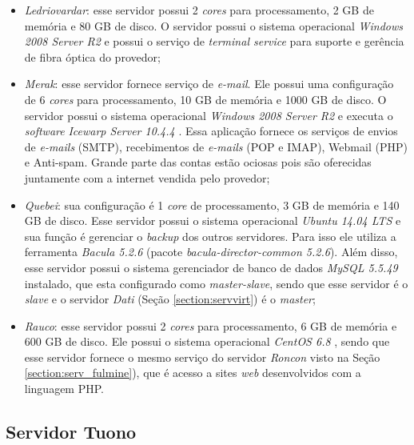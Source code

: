 \begin{itemize}
 \item \textit{Ledriovardar}: esse servidor possui 2 \textit{cores} para processamento, 2 GB de memória e 80 GB de disco. O servidor possui 
 o sistema operacional \textit{Windows 2008 Server R2} e possui o serviço de \textit{terminal service} para suporte e gerência de fibra 
 óptica do provedor;
 
 \item \textit{Merak}: esse servidor fornece serviço de \textit{e-mail}. Ele possui uma configuração de 6 \textit{cores} para processamento, 
 10 GB de memória e 1000 GB de disco. O servidor possui o sistema operacional \textit{Windows 2008 Server R2} e executa o \textit{software} 
 \textit{Icewarp Server 10.4.4} \cite{icewarp}. Essa aplicação fornece os serviços de envios de \textit{e-mails} (\ac{SMTP}), recebimentos 
 de \textit{e-mails} (\ac{POP} e \ac{IMAP}), Webmail (\ac{PHP}) e Anti-spam.
 Grande parte das contas estão ociosas pois são oferecidas juntamente com a internet vendida pelo provedor;
 
 \item \textit{Quebei}: sua configuração é 1 \textit{core} de processamento, 3 GB de memória e 140 GB de disco. Esse servidor possui o 
 sistema operacional \textit{Ubuntu 14.04 \ac{LTS}} \cite{ubuntu} e sua função é gerenciar o \textit{backup} dos outros servidores. Para isso 
 ele utiliza a ferramenta \textit{Bacula 5.2.6} \cite{bacula} (pacote \textit{bacula-director-common 5.2.6}). Além disso, esse servidor possui 
 o sistema gerenciador de banco de dados \textit{MySQL 5.5.49} \cite{mysql} instalado, que esta configurado como \textit{master-slave}, sendo 
 que esse servidor é o \textit{slave} e o servidor \textit{Dati} (Seção \ref{section:servvirt}) é o \textit{master};
 
 \item \textit{Rauco}: esse servidor possui 2 \textit{cores} para processamento, 6 GB de memória e 600 GB de disco. Ele possui o sistema 
 operacional \textit{CentOS 6.8} \cite{centos}, sendo que esse servidor fornece o mesmo serviço do servidor \textit{Roncon} visto na 
 Seção \ref{section:serv_fulmine}), que é acesso a sites \textit{web} desenvolvidos com a linguagem \ac{PHP}.
\end{itemize}

\subsection{Servidor Tuono}
\label{section:serv_tuono}

